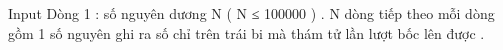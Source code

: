 Input
Dòng 1 : số nguyên dương N ( N ≤ 100000 ) . N dòng tiếp theo mỗi dòng gồm 1 số nguyên ghi ra số chỉ trên trái bi mà thám tử lần lượt bốc lên được .